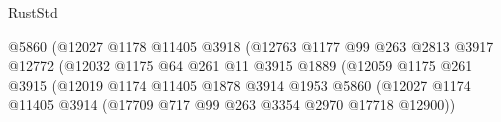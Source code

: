 \begin{lexlean}{RustStd}
\begin{coremodule}
{\begin{coremodule}
{{{{{{{{{{{{{{{{{{{{{{{{{{{{{                                                @5860
                                                (@12027
                                                  @1178
                                                  @11405
                                                  @3918
                                                  (@12763
                                                    @1177
                                                    @99
                                                    @263
                                                    @2813
                                                    @3917
                                                    @12772
                                                    (@12032
                                                      @1175
                                                      @64
                                                      @261
                                                      @11
                                                      @3915
                                                      @1889
                                                      (@12059
                                                        @1175
                                                        @261
                                                        @3915
                                                        (@12019
                                                          @1174
                                                          @11405
                                                          @1878
                                                          @3914
                                                          @1953
                                                          @5860
                                                          (@12027
                                                            @1174
                                                            @11405
                                                            @3914
                                                            (@17709
                                                              @717
                                                              @99
                                                              @263
                                                              @3354
                                                              @2970
                                                              @17718
                                                              @12900))
}}}}}}}}}}}}}}}}}}}}}}}}}}}}}
\end{coremodule}}
\end{coremodule}
\end{lexlean}
